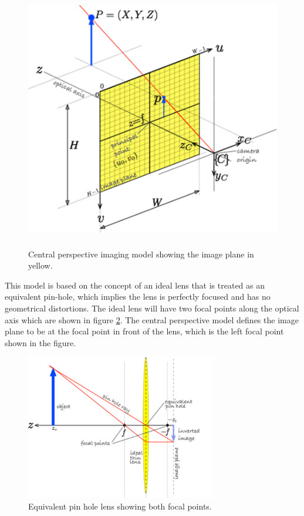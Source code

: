 \begin{figure}[htb]
	\centering
    \includegraphics[height=4.5in]{figures/projection_model.png}
    \caption[Projection model]{Central perspective imaging model showing the image plane in yellow.}
    \label{projection_model}
\end{figure}
 
 This model is based on the concept of an ideal lens that is treated as an equivalent pin-hole, which implies the lens is perfectly focused and has no geometrical distortions.  The ideal lens will have two focal points along the optical axis which are shown in figure \ref{focal_points}.  The central perspective model defines the image plane to be at the focal point in front of the lens, which is the left focal point shown in the figure.  

\begin{figure}[htb]
	\centering
    \includegraphics[height=2.5in]{figures/projections_two_focal.png}
    \caption[Focal points]{Equivalent pin hole lens showing both focal points.}
    \label{focal_points}
\end{figure} 


